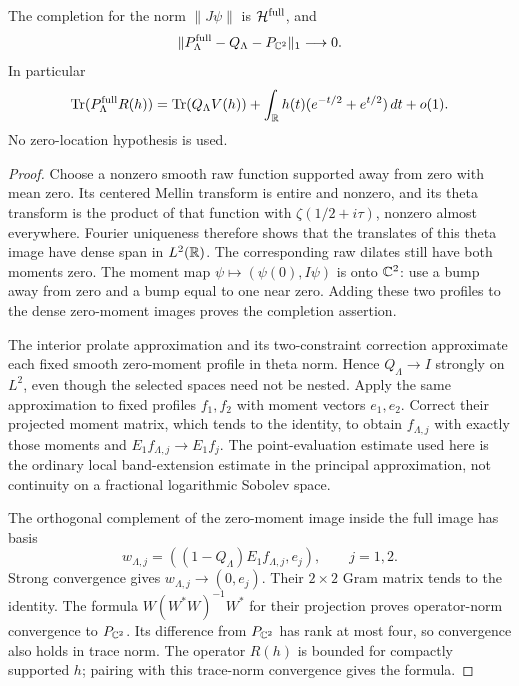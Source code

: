 \begin{proposition}\label{prop:polar-trace}
The completion for the norm $\|J\psi\|$ is $\mathcal H^{\rm full}$,
and
\[
 \|P_\Lambda^{\rm full}-Q_\Lambda-P_{\mathbb C^2}\|_1\longrightarrow0.
\]
In particular
\[
 \operatorname{Tr}(P_\Lambda^{\rm full}R(h))
 =\operatorname{Tr}(Q_\Lambda V(h))
   +\int_\mathbb R h(t)(e^{-t/2}+e^{t/2})\,dt+o(1).
\]
No zero-location hypothesis is used.
\end{proposition}
\begin{proof}
Choose a nonzero smooth raw function supported away from zero
with mean zero. Its centered Mellin transform is entire and
nonzero, and its theta transform is the product of that function
with $\zeta(1/2+i\tau)$, nonzero almost everywhere. Fourier
uniqueness therefore shows that the translates of this theta
image have dense span in $L^2(\mathbb R)$. The corresponding raw
dilates still have both moments zero. The moment map
$\psi\mapsto(\psi(0),I\psi)$ is onto $\mathbb C^2$: use a bump
away from zero and a bump equal to one near zero. Adding these
two profiles to the dense zero-moment images proves the
completion assertion.

The interior prolate approximation and its two-constraint
correction approximate each fixed smooth zero-moment profile in
theta norm. Hence $Q_\Lambda\to I$ strongly on $L^2$, even
though the selected spaces need not be nested. Apply the same
approximation to fixed profiles $f_1,f_2$ with moment vectors
$e_1,e_2$. Correct their projected moment matrix, which tends
to the identity, to obtain $f_{\Lambda,j}$ with exactly those
moments and $E_1f_{\Lambda,j}\to E_1f_j$. The point-evaluation
estimate used here is the ordinary local band-extension estimate
in the principal approximation, not continuity on a fractional
logarithmic Sobolev space.

The orthogonal complement of the zero-moment image inside the
full image has basis
\[
 w_{\Lambda,j}=((1-Q_\Lambda)E_1f_{\Lambda,j},e_j),\qquad j=1,2.
\]
Strong convergence gives $w_{\Lambda,j}\to(0,e_j)$. Their
$2\times2$ Gram matrix tends to the identity. The formula
$W(W^*W)^{-1}W^*$ for their projection proves operator-norm
convergence to $P_{\mathbb C^2}$. Its difference from $P_{\mathbb C^2}$ has
rank at most four, so convergence also holds in trace norm.
The operator $R(h)$ is bounded for compactly supported $h$;
pairing with this trace-norm convergence gives the formula.
\end{proof}

